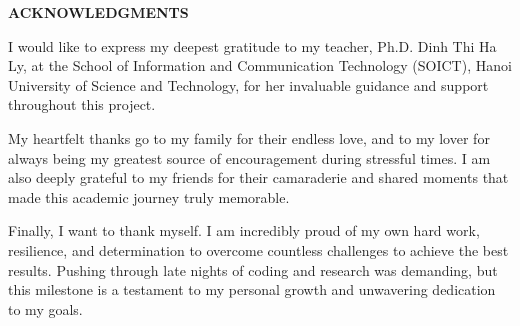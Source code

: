 \documentclass[../Main.tex]{subfiles}
\begin{document}
\begin{center}
    \Large{\textbf{ACKNOWLEDGMENTS}}\\
\end{center}
\vspace{1cm}

I would like to express my deepest gratitude to my teacher, Ph.D. Dinh Thi Ha Ly, at the School of Information and Communication Technology (SOICT), Hanoi University of Science and Technology, for her invaluable guidance and support throughout this project.

My heartfelt thanks go to my family for their endless love, and to my lover for always being my greatest source of encouragement during stressful times. I am also deeply grateful to my friends for their camaraderie and shared moments that made this academic journey truly memorable.

Finally, I want to thank myself. I am incredibly proud of my own hard work, resilience, and determination to overcome countless challenges to achieve the best results. Pushing through late nights of coding and research was demanding, but this milestone is a testament to my personal growth and unwavering dedication to my goals.
\end{document}
